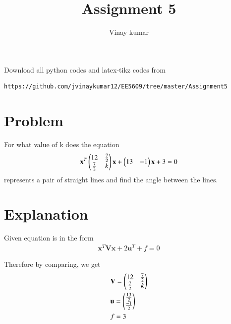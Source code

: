 \documentclass[journal,12pt,twocolumn]{IEEEtran}
\begin{document}
\makeatletter
{}
\makeatother
\let\StandardTheFigure\thefigure
\let\vec\mathbf
\renewcommand{\thefigure}{\theproblem}
\def\putbox#1#2#3{\makebox[0in][l]{\makebox[#1][l]{}\raisebox{\baselineskip}[0in][0in]{\raisebox{#2}[0in][0in]{#3}}}}
     \def\rightbox#1{\makebox[0in][r]{#1}}
     \def\centbox#1{\makebox[0in]{#1}}
     \def\topbox#1{\raisebox{-\baselineskip}[0in][0in]{#1}}
     \def\midbox#1{\raisebox{-0.5\baselineskip}[0in][0in]{#1}}
\vspace{3cm}
\title{Assignment 5}
\author{Vinay kumar}
\maketitle
\newpage
Download all python codes
and latex-tikz codes from 
%
\begin{lstlisting}
https://github.com/jvinaykumar12/EE5609/tree/master/Assignment5
\end{lstlisting}
%
\section{Problem}
For what value of k does the equation 
\begin{align}
\vec{x}^T\myvec{12 & \frac{7}{2} \\ \frac{7}{2} & k}\vec{x} + \myvec{13 & -1}\vec{x} + 3 = 0 
\label{eq:a0}
\end{align}
represents a pair of straight lines and find the angle between the lines.
\section{Explanation}

Given equation is in the form 
\begin{align}
\vec{x}^T\vec{V}\vec{x} + 2\vec{u}^T + f = 0
\label{eq:a1}
\end{align}

Therefore by comparing, we get
\begin{align}
&\vec{V} = \myvec{12 & \frac{7}{2} \\ \frac{7}{2} & k} \label{eq:a2}\\
&\vec{u} = \myvec{\frac{13}{2} \\ \frac{-1}{2}}  \\
&f = 3 
\end{align}
\end{document}
